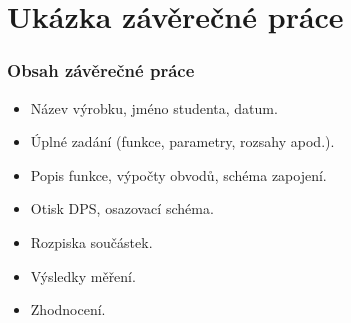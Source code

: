 \documentclass{beamer}
\begin{document}
\section{\texorpdfstring{Ukázka závěrečné práce}{Ukazka zaverecne prace}}
	\begin{frame}
    \frametitle{Obsah závěrečné práce}
		
		\begin{itemize}
			\item Název výrobku, jméno studenta, datum.
			\item Úplné zadání (funkce, parametry, rozsahy apod.).
			\item Popis funkce, výpočty obvodů, schéma zapojení.
			\item Otisk DPS, osazovací schéma.
			\item Rozpiska součástek.
			\item Výsledky měření.
			\item Zhodnocení.
		\end{itemize}
	
	\end{frame}
\end{document}
